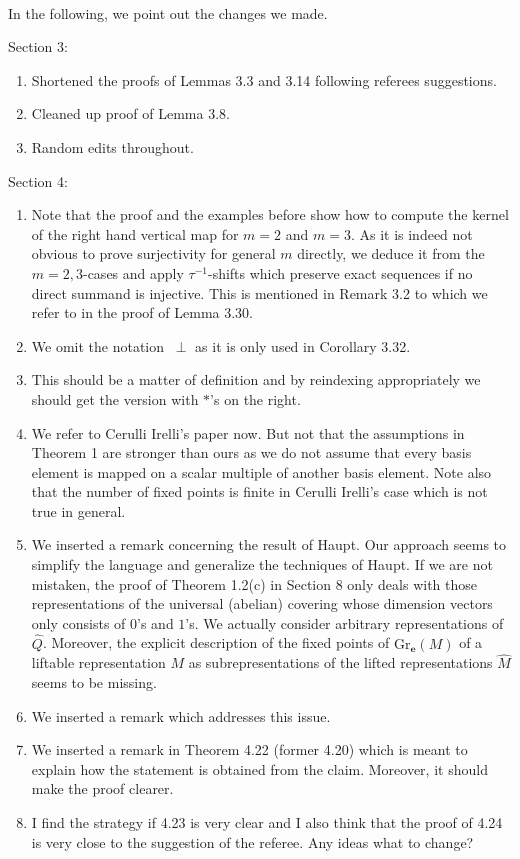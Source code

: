 \documentclass[titlepage,11pt,a4paper]{{scrartcl}}
\begin{document}
\pagestyle{empty}


\\



\noindent In the following, we point out the changes we made.

Section 3:
\renewcommand{\labelenumi}{(\arabic{enumi})}
\begin{enumerate}
  \item Shortened the proofs of Lemmas 3.3 and 3.14 following referees suggestions.
  \item Cleaned up proof of Lemma 3.8.
  \item Random edits throughout.
\end{enumerate}

Section 4:
\begin{enumerate}
\renewcommand{\labelenumi}{(\arabic{enumi})}
\item Note that the proof and the examples before show how to compute the kernel of the right hand vertical map for $m=2$ and $m=3$. As it is indeed not obvious to prove surjectivity for general $m$ directly, we deduce it from the $m=2,3$-cases and apply $\tau^{-1}$-shifts which preserve exact sequences if no direct summand is injective. This is mentioned in Remark 3.2 to which we refer to in the proof of Lemma 3.30.
\item We omit the notation $~\perp$ as it is only used in Corollary 3.32.
\item This should be a matter of definition and by reindexing appropriately we should get the version with $\ast$'s on the right.
\item We refer to Cerulli Irelli's paper now. But not that the assumptions in Theorem 1 are stronger than ours as we do not assume that every basis element is mapped on a scalar multiple of another basis element. Note also that the number of fixed points is finite in Cerulli Irelli's case which is not true in general.
\item We inserted a remark concerning the result of Haupt. Our approach seems to simplify the language and generalize the techniques of Haupt. If we are not mistaken, the proof of Theorem 1.2(c) in Section 8 only deals with those representations of the universal (abelian) covering whose dimension vectors only consists of $0$'s and $1$'s. We actually consider arbitrary representations of $\hat Q$. Moreover, the explicit description of the fixed points of $\mathrm{Gr}_{\mathbf{e}}(M)$ of a liftable representation $M$ as subrepresentations of the lifted representations $\hat M$ seems to be missing.  

\item We inserted a remark which addresses this issue.
\item We inserted a remark in Theorem 4.22 (former 4.20) which is meant to explain how the statement is obtained from the claim. Moreover, it should make the proof clearer.
\item I find the strategy if 4.23 is very clear and I also think that the proof of 4.24 is very close to the suggestion of the referee. Any ideas what to change?
\end{enumerate}
\end{document}
